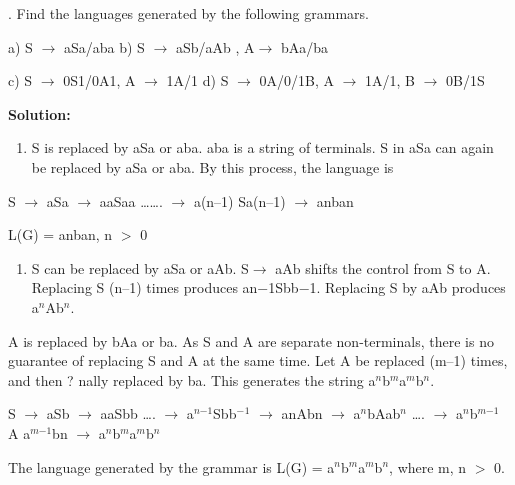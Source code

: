 \documentclass{article} %
\begin{document}


. Find the languages generated by the following grammars.

\noindent  a)   S $\mathrm{\to}$ aSa/aba                              b)   S $\mathrm{\to}$ aSb/aAb , A$\mathrm{\to}$ bAa/ba      

\noindent  c) S $\mathrm{\to}$ 0S1/0A1, A $\mathrm{\to}$ 1A/1                d) S $\mathrm{\to}$ 0A/0/1B, A $\mathrm{\to}$ 1A/1, B $\mathrm{\to}$ 0B/1S 

\noindent \textbf{Solution:}

\begin{enumerate}
\item \textbf{ }S is replaced by aSa or aba. aba is a string of terminals. S in aSa can again be replaced by aSa or aba. By this process, the language is
\end{enumerate}

\noindent                                                             S $\mathrm{\to}$ aSa $\mathrm{\to}$ aaSaa {\dots}{\dots}. $\mathrm{\to}$ a(n--1) Sa(n--1) $\mathrm{\to}$ anban 

\noindent                                                               L(G) = anban, n $\mathrm{>}$ 0

\begin{enumerate}
\item   S can be replaced by aSa or aAb. S$\mathrm{\to}$ aAb shifts the control from S to A. Replacing S (n--1) times produces an$\mathrm{-}$1Sbb$\mathrm{-}$1. Replacing S by aAb produces a${}^{n}$Ab${}^{n}$.
\end{enumerate}

\noindent    A is replaced by bAa or ba. As S and A are separate non-terminals, there is no guarantee of replacing S and A at the same time. Let A be replaced (m--1) times, and then ? nally replaced by ba. This generates the string a${}^{n}$b${}^{m}$a${}^{m}$b${}^{n}$. 

\noindent S $\mathrm{\to}$ aSb $\mathrm{\to}$ aaSbb {\dots}. $\mathrm{\to}$ a${}^{n\mathrm{-}1}$Sbb${}^{\mathrm{-}}$${}^{1}$ $\mathrm{\to}$ anAbn $\mathrm{\to}$ a${}^{n}$bAab${}^{n}$ {\dots}. $\mathrm{\to}$ a${}^{n}$b${}^{m\mathrm{-}1}$ A a${}^{m\mathrm{-}1}$bn $\mathrm{\to}$ a${}^{n}$b${}^{m}$a${}^{m}$b${}^{n}$

\noindent  The language generated by the grammar is L(G) = a${}^{n}$b${}^{m}$a${}^{m}$b${}^{n}$, where m, n $\mathrm{>}$ 0. 
\end{document}
